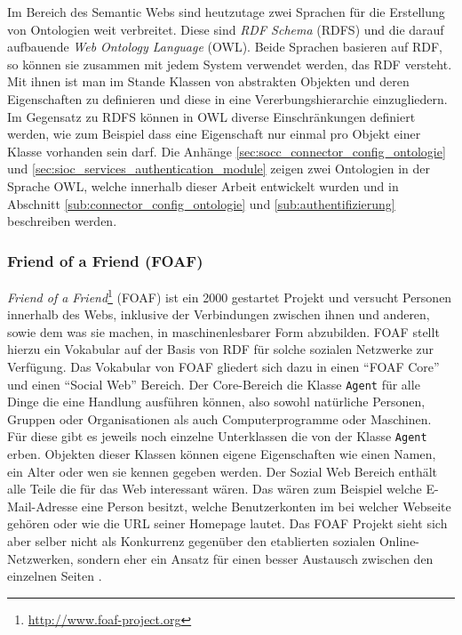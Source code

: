 Im Bereich des Semantic Webs sind heutzutage zwei Sprachen für die Erstellung von Ontologien weit verbreitet. Diese sind \emph{RDF Schema} (RDFS)\cite{Brickley} und die darauf aufbauende \emph{Web Ontology Language} (OWL)\cite{partelschneider2004}. Beide Sprachen basieren auf RDF, so können sie zusammen mit jedem System verwendet werden, das RDF versteht. Mit ihnen ist man im Stande Klassen von abstrakten Objekten und deren Eigenschaften zu definieren und diese in eine Vererbungshierarchie einzugliedern. Im Gegensatz zu RDFS können in OWL diverse Einschränkungen definiert werden, wie zum Beispiel dass eine Eigenschaft nur einmal pro Objekt einer Klasse vorhanden sein darf. Die Anhänge \ref{sec:socc_connector_config_ontologie} und \ref{sec:sioc_services_authentication_module} zeigen zwei Ontologien in der Sprache OWL, welche innerhalb dieser Arbeit entwickelt wurden und in Abschnitt \ref{sub:connector_config_ontologie} und \ref{sub:authentifizierung} beschreiben werden.



\subsubsection{Friend of a Friend (FOAF)} %
\label{ssub:friend_of_a_friend_}

\emph{Friend of a Friend}\footnote{\url{http://www.foaf-project.org}} (FOAF) ist ein 2000 gestartet Projekt und versucht Personen innerhalb des Webs, inklusive der Verbindungen zwischen ihnen und anderen, sowie dem was sie machen, in maschinenlesbarer Form abzubilden. FOAF stellt hierzu ein Vokabular \cite{Brickley2010} auf der Basis von RDF für solche sozialen Netzwerke zur Verfügung. Das Vokabular von FOAF gliedert sich dazu in einen \enquote{FOAF Core} und einen \enquote{Social Web} Bereich. Der Core-Bereich die Klasse \texttt{Agent} für alle Dinge die eine Handlung ausführen können, also sowohl natürliche Personen, Gruppen oder Organisationen als auch Computerprogramme oder Maschinen. Für diese gibt es jeweils noch einzelne Unterklassen die von der Klasse \texttt{Agent} erben. Objekten dieser Klassen können eigene Eigenschaften wie einen Namen, ein Alter oder wen sie kennen gegeben werden. Der Sozial Web Bereich enthält alle Teile die für das Web interessant wären. Das wären zum Beispiel welche E-Mail-Adresse eine Person besitzt, welche Benutzerkonten im bei welcher Webseite gehören oder wie die URL seiner Homepage lautet. Das FOAF Projekt sieht sich aber selber nicht als Konkurrenz gegenüber den etablierten sozialen Online-Netzwerken, sondern eher ein Ansatz für einen besser Austausch zwischen den einzelnen Seiten \cite[Abstract]{Brickley2010}.

